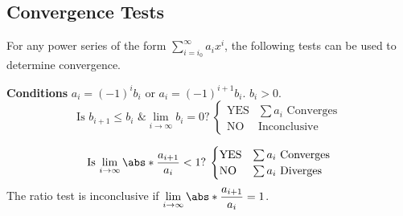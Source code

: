 \documentclass{article}
\begin{document}
\subsection{Convergence Tests}
For any power series of the form \(\displaystyle\sum_{i=i_0}^\infty
a_i x^i\), the following tests can be used to determine convergence.
\begin{tcolorboxlarge}[title={Alternating Series}]
    \textbf{Conditions} \(a_i = \left( -1 \right)^i b_i\) or
    \(a_i = \left( -1 \right)^{i+1} b_i\). \(b_i>0\).
    \begin{equation*}
        \text{Is \(b_{i+1}\leqslant b_i\) \& \(\lim_{i\to\infty}b_i=0\)?}\:
        \begin{cases}
            \text{YES} & \text{\(\sum a_i\) Converges} \\
            \text{NO}  & \text{Inconclusive}
        \end{cases}
    \end{equation*}
\end{tcolorboxlarge}
\begin{tcolorboxlarge}[title={Ratio Test}]
    \begin{equation*}
        \text{Is \(\lim_{i\to\infty}\abs*{\frac{a_{i+1}}{a_i}} < 1\)?}\:
        \begin{cases}
            \text{YES} & \text{\(\sum a_i\) Converges} \\
            \text{NO}  & \text{\(\sum a_i\) Diverges}
        \end{cases}
    \end{equation*}
    The ratio test is inconclusive if
    \(\displaystyle \lim_{i\to\infty}\abs*{\frac{a_{i+1}}{a_i}} = 1\).
\end{tcolorboxlarge}
\end{document}
